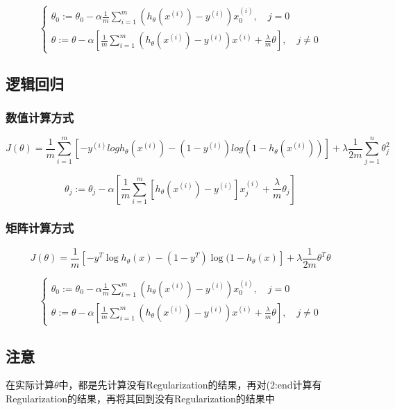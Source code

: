 \[\begin{cases}
	\theta_0 := \theta_0 - \alpha \frac{1}{m} \sum_{i=1}^m(h_\theta(x^{(i)}) - y^{(i)})x_0^{(i)}, \quad j=0 \\
	\theta := \theta - \alpha [\frac{1}{m} \sum_{i=1}^m(h_\theta(x^{(i)}) - y^{(i)})x^{(i)} + \frac{\lambda}{m}\theta], \quad j \neq 0
\end{cases}\]




\subsection{逻辑回归}

\subsubsection{数值计算方式}
\begin{equation}
	J(\theta) = \frac{1}{m}
	    \sum_{i=1}^m \left[ -y^{(i)}log{h_\theta(x^{(i)})} - (1-y^{(i)})log{(1-h_\theta(x^{(i)}))} \right]
		+ \lambda \frac{1}{2m} \sum_{j=1}^n\theta_j^2
\end{equation}

\begin{equation}
	\theta_j := \theta_j - \alpha \left[\frac{1}{m}\sum_{i=1}^m [h_\theta(x^{(i)})-y^{(i)}]x_j^{(i)} + \frac{\lambda}{m}\theta_j\right]
\end{equation}

\subsubsection{矩阵计算方式}
\begin{equation}
		J(\theta) = \frac{1}{m} [-y^T \log{h_\theta(x)} - (1-y^T) \log{(1-h_\theta(x)}] + \lambda \frac{1}{2m}\theta^T \theta
\end{equation}

\[\begin{cases}
	\theta_0 := \theta_0 - \alpha \frac{1}{m} \sum_{i=1}^m(h_\theta(x^{(i)}) - y^{(i)})x_0^{(i)}, \quad j=0 \\
	\theta := \theta - \alpha [\frac{1}{m} \sum_{i=1}^m(h_\theta(x^{(i)}) - y^{(i)})x^{(i)} + \frac{\lambda}{m}\theta], \quad j \neq 0
\end{cases}\]



\subsection{注意}
在实际计算$\theta$中，都是先计算没有Regularization的结果，再对(2:end计算有Regularization的结果，再将其回到没有Regularization的结果中






